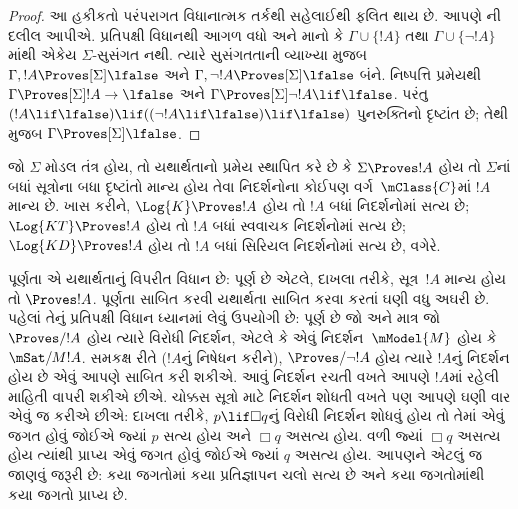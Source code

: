 \begin{proof}
  આ હકીકતો પરંપરાગત વિધાનાત્મક તર્કથી સહેલાઈથી ફલિત થાય છે. આપણે
  ની દલીલ આપીએ. પ્રતિપક્ષી વિધાનથી
  આગળ વધો અને માનો કે $\Gamma \cup \{ !A \}$ તથા
  $\Gamma \cup \{ \lnot!A \}$માંથી એકેય $\Sigma$-સુસંગત નથી.
  ત્યારે સુસંગતતાની વ્યાખ્યા મુજબ $\Gamma, !A \Proves[\Sigma]
  \lfalse$ અને $\Gamma, \lnot !A \Proves[\Sigma] \lfalse$ બંને.
  નિષ્પત્તિ પ્રમેયથી $\Gamma \Proves[\Sigma] !A \to \lfalse$ અને
  $\Gamma \Proves[\Sigma] \lnot!A \lif \lfalse$. પરંતુ $(!A \lif
  \lfalse) \lif ((\lnot!A \lif \lfalse) \lif \lfalse)$ પુનરુક્તિનો
  દૃષ્ટાંત છે; તેથી
   મુજબ
  $\Gamma \Proves[\Sigma] \lfalse$.
\end{proof}

\endgroup


\OLEndChapterHook
\endgroup


\begingroup
\makeatletter{}\makeatother

\label{guunit:OLP-0441}


\begingroup
\makeatletter{}\makeatother


\label{guunit:OLP-0442}


જો $\Sigma$ મોડલ તંત્ર હોય, તો યથાર્થતાનો પ્રમેય સ્થાપિત કરે છે કે
$\Sigma \Proves !A$ હોય તો $\Sigma$નાં બધાં સૂત્રોના બધા
દૃષ્ટાંતો માન્ય હોય તેવા નિદર્શનોના કોઈપણ વર્ગ~$\mClass{C}$માં
$!A$ માન્ય છે. ખાસ કરીને, $\Log{K} \Proves !A$ હોય તો $!A$ બધાં
નિદર્શનોમાં સત્ય છે; $\Log{KT} \Proves !A$ હોય તો $!A$ બધાં
સ્વવાચક નિદર્શનોમાં સત્ય છે; $\Log{KD} \Proves !A$ હોય તો
$!A$ બધાં સિરિયલ નિદર્શનોમાં સત્ય છે, વગેરે.

પૂર્ણતા એ યથાર્થતાનું વિપરીત વિધાન છે:  પૂર્ણ છે એટલે, દાખલા
તરીકે, સૂત્ર~$!A$ માન્ય હોય તો $\Proves !A$. પૂર્ણતા
સાબિત કરવી યથાર્થતા સાબિત કરવા કરતાં ઘણી વધુ અઘરી છે. પહેલાં તેનું
પ્રતિપક્ષી વિધાન ધ્યાનમાં લેવું ઉપયોગી છે:  પૂર્ણ છે જો અને
માત્ર જો $\Proves/ !A$ હોય ત્યારે વિરોધી નિદર્શન, એટલે કે એવું
નિદર્શન~$\mModel{M}$ હોય કે $\mSat/{M}{!A}$. સમકક્ષ રીતે ($!A$નું
નિષેધન કરીને), $\Proves/ \lnot !A$ હોય ત્યારે $!A$નું નિદર્શન
હોય છે એવું આપણે સાબિત કરી શકીએ. આવું નિદર્શન રચતી વખતે આપણે
$!A$માં રહેલી માહિતી વાપરી શકીએ છીએ. ચોક્કસ સૂત્રો માટે
નિદર્શન શોધતી વખતે પણ આપણે ઘણી વાર એવું જ કરીએ છીએ: દાખલા તરીકે,
$p \lif \Box q$નું વિરોધી નિદર્શન શોધવું હોય તો તેમાં એવું જગત
હોવું જોઈએ જ્યાં $p$ સત્ય હોય અને $\Box q$ અસત્ય હોય. વળી જ્યાં
$\Box q$ અસત્ય હોય ત્યાંથી પ્રાપ્ય એવું જગત હોવું જોઈએ જ્યાં $q$
અસત્ય હોય. આપણને એટલું જ જાણવું જરૂરી છે: કયા જગતોમાં કયા
પ્રતિજ્ઞાપન ચલો સત્ય છે અને કયા જગતોમાંથી કયા જગતો
પ્રાપ્ય છે.

